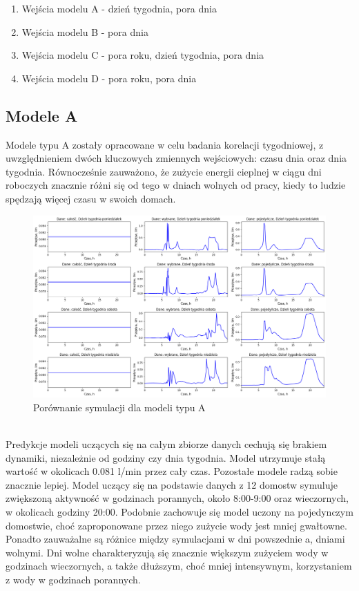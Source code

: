 \documentclass[a4paper,twoside,12pt]{book}
\begin{document}
\begin{enumerate}
  \item Wejścia modelu A - dzień tygodnia, pora dnia
  \item Wejścia modelu B - pora dnia
  \item Wejścia modelu C - pora roku, dzień tygodnia, pora dnia
  \item Wejścia modelu D - pora roku, pora dnia
\end{enumerate}

\subsection*{Modele A}
Modele typu A zostały opracowane w celu badania korelacji tygodniowej, z uwzględnieniem dwóch kluczowych zmiennych wejściowych: czasu dnia oraz dnia tygodnia. Równocześnie zauważono, że zużycie energii cieplnej w ciągu dni roboczych znacznie różni się od tego w dniach wolnych od pracy, kiedy to ludzie spędzają więcej czasu w swoich domach.\\
\begin{figure}[!h]
  \centering
  \includegraphics[width=1\textwidth]{img/Model_A.png}
  \caption{Porównanie symulacji dla modeli typu A}
  \label{fig:etykieta-rysunku}
\end{figure}\\

Predykcje modeli uczących się na całym zbiorze danych cechują się brakiem dynamiki, niezależnie od godziny czy dnia tygodnia. Model utrzymuje stałą wartość w okolicach 0.081 l/min przez cały czas. Pozostałe modele radzą sobie znacznie lepiej. Model uczący się na podstawie danych z 12 domostw symuluje zwiększoną aktywność w godzinach porannych, około 8:00-9:00 oraz wieczornych, w okolicach godziny 20:00. Podobnie zachowuje się model uczony na pojedynczym domostwie, choć zaproponowane przez niego zużycie wody jest mniej gwałtowne. Ponadto zauważalne są różnice między symulacjami w dni powszednie a, dniami wolnymi. Dni wolne charakteryzują się znacznie większym zużyciem wody w godzinach wieczornych, a także dłuższym, choć mniej intensywnym, korzystaniem z wody w godzinach porannych.
\end{document}
